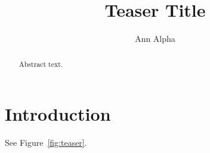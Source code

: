 \documentclass[twocolumn]{article}
\begin{document}
\title{Teaser Title}
\author{Ann Alpha}
\twocolumn[{%
\renewcommand\twocolumn[1][]{#1}%
\maketitle
\begin{center}
  \captionsetup{type=figure}
  \rule{4cm}{1cm}
  \captionof{figure}{The teaser.}
  \label{fig:teaser}
\end{center}%
}]
\begin{abstract}
Abstract text.
\end{abstract}
\section{Introduction}
See Figure~\ref{fig:teaser}.
\end{document}
